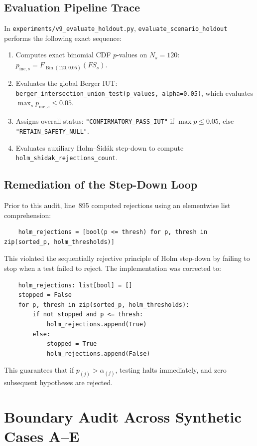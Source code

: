 \documentclass[10pt,a4paper]{article}
\begin{document}
\subsection{Evaluation Pipeline Trace}
In \texttt{experiments/v9\_evaluate\_holdout.py}, \texttt{evaluate\_scenario\_holdout} performs the following exact sequence:
\begin{enumerate}
    \item Computes exact binomial CDF $p$-values on $N_s = 120$: $p_{\mathrm{inc}, s} = F_{\operatorname{Bin}(120, 0.05)}(FS_s)$.
    \item Evaluates the global Berger IUT: \texttt{berger\_intersection\_union\_test(p\_values, alpha=0.05)}, which evaluates $\max_{s} p_{\mathrm{inc}, s} \le 0.05$.
    \item Assigns overall status: \texttt{"CONFIRMATORY\_PASS\_IUT"} if $\max p \le 0.05$, else \texttt{"RETAIN\_SAFETY\_NULL"}.
    \item Evaluates auxiliary Holm--Šidák step-down to compute \texttt{holm\_shidak\_rejections\_count}.
\end{enumerate}

\subsection{Remediation of the Step-Down Loop}
Prior to this audit, line~895 computed rejections using an elementwise list comprehension:
\begin{verbatim}
    holm_rejections = [bool(p <= thresh) for p, thresh in zip(sorted_p, holm_thresholds)]
\end{verbatim}
This violated the sequentially rejective principle of Holm step-down by failing to stop when a test failed to reject. The implementation was corrected to:
\begin{verbatim}
    holm_rejections: list[bool] = []
    stopped = False
    for p, thresh in zip(sorted_p, holm_thresholds):
        if not stopped and p <= thresh:
            holm_rejections.append(True)
        else:
            stopped = True
            holm_rejections.append(False)
\end{verbatim}
This guarantees that if $p_{(j)} > \alpha_{(j)}$, testing halts immediately, and zero subsequent hypotheses are rejected.

\section{Boundary Audit Across Synthetic Cases A--E}
\end{document}
